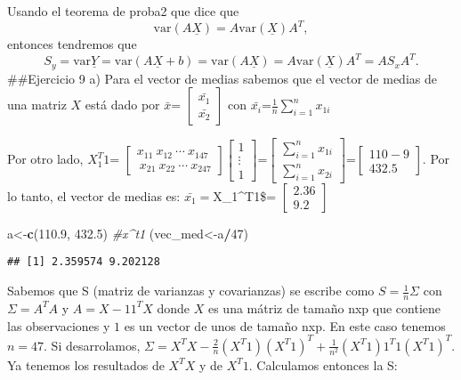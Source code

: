 \documentclass[]{article}
\newenvironment{Shaded}{\begin{snugshade}}{\end{snugshade}}
\newcommand{\CommentTok}[1]{\textcolor[rgb]{0.56,0.35,0.01}{\textit{#1}}}
\newcommand{\DecValTok}[1]{\textcolor[rgb]{0.00,0.00,0.81}{#1}}
\newcommand{\FloatTok}[1]{\textcolor[rgb]{0.00,0.00,0.81}{#1}}
\newcommand{\KeywordTok}[1]{\textcolor[rgb]{0.13,0.29,0.53}{\textbf{#1}}}
\newcommand{\NormalTok}[1]{#1}
\newcommand{\OperatorTok}[1]{\textcolor[rgb]{0.81,0.36,0.00}{\textbf{#1}}}
\begin{document}
Usando el teorema de proba2 que dice que
\[ \text{var}(A\underline{X}) = A \text{var}(\underline{X}) A^{T},\]
entonces tendremos que
\[S_{y} = \text{var}{\underline{Y}} = \text{var}(A\underline{X} + b) = \text{var}(A\underline{X}) = A\text{var}(\underline{X})A^{T} = AS_{x}A^{T}.\]
\#\#Ejercicio 9 a) Para el vector de medias sabemos que el vector de
medias de una matriz \(X\) está dado por \(\bar{x}\)=
\(\begin{bmatrix} \bar{x_1}\\ \bar{x_2}\end{bmatrix}\) con
\(\bar{x_i}\)=\(\frac{1}{n}\sum_{i=1}^{n}x_{1i}\)

Por otro lado, \(X_1^T1\)=
\(\begin{bmatrix} x_{11}\ x_{12}\ \cdots \ x_{147}\\ \ x_{21}\ x_{22}\ \cdots\ x_{247}\end{bmatrix} \begin{bmatrix} 1 \\ \vdots \\ 1\end{bmatrix}\)=\(\begin{bmatrix} \sum_{i=1}^{n}x_{1i}\\ \sum_{i=1}^{n}x_{2i}\end{bmatrix}\)=\(\begin{bmatrix} 110-9\\ 432.5\end{bmatrix}\).
Por lo tanto, el vector de medias es: \(\bar{x_1}=\)X\_1\^{}T1\$=
\(\begin{bmatrix} 2.36\\ 9.2\end{bmatrix}\)

\begin{Shaded}
\begin{Highlighting}[]
\NormalTok{a<-}\KeywordTok{c}\NormalTok{(}\FloatTok{110.9}\NormalTok{, }\FloatTok{432.5}\NormalTok{) }\CommentTok{#x^t1}
\NormalTok{(vec_med<-a}\OperatorTok{/}\DecValTok{47}\NormalTok{)}
\end{Highlighting}
\end{Shaded}

\begin{verbatim}
## [1] 2.359574 9.202128
\end{verbatim}

Sabemos que S (matriz de varianzas y covarianzas) se escribe como
\(S= \frac{1}{n} \Sigma\) con \(\Sigma=A^TA\) y \(A=X-11^TX\) donde
\(X\) es una mátriz de tamaño nxp que contiene las observaciones y \(1\)
es un vector de unos de tamaño nxp. En este caso tenemos \(n=47\). Si
desarrolamos,
\(\Sigma=X^TX-\frac{2}{n}(X^T1)(X^T1)^T+\frac{1}{n^2}(X^T1)1^T1(X^T1)^T\).
Ya tenemos los resultados de \(X^TX\) y de \(X^T1\). Calculamos entonces
la S:
\end{document}
